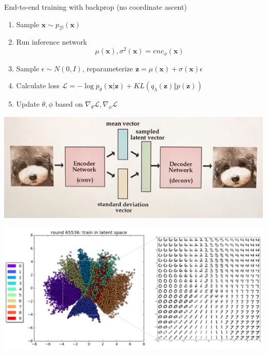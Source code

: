 \documentclass{beamer}
\newcommand{\zvec}{\mathbf{z}}
\newcommand{\xvec}{\mathbf{x}}
\begin{document}
\begin{frame}
  \begin{center}
   \end{center}
End-to-end training with backprop (no coordinate ascent)
\begin{enumerate}
\item Sample $\xvec \sim p_\mathcal{D}(\xvec)$
\item Run inference network 
\[ \mu(\xvec),  \sigma^2(\xvec) = enc_\phi(\xvec)\]
\item Sample $\epsilon \sim N(0, I)$, reparameterize $\zvec = \mu(\xvec) + \sigma (\xvec) \epsilon $
\item Calculate loss $\mathcal{L} = - \log p_\theta(\xvec | \zvec) + KL(q_\lambda(\zvec) \Vert p(\zvec))$
\item Update $\theta, \phi$ based on $\nabla_\theta \mathcal{L}, \nabla_\phi \mathcal{L} $
\end{enumerate}
\end{frame}

\begin{frame}
  \begin{center}
   \end{center}
   \center
   \includegraphics[scale=0.5]{img/vae-ara}
\end{frame}


\begin{frame}
  \begin{center}
   \end{center}
   \center
   \includegraphics[scale=0.5]{img/vae2}
\end{frame}
\end{document}
